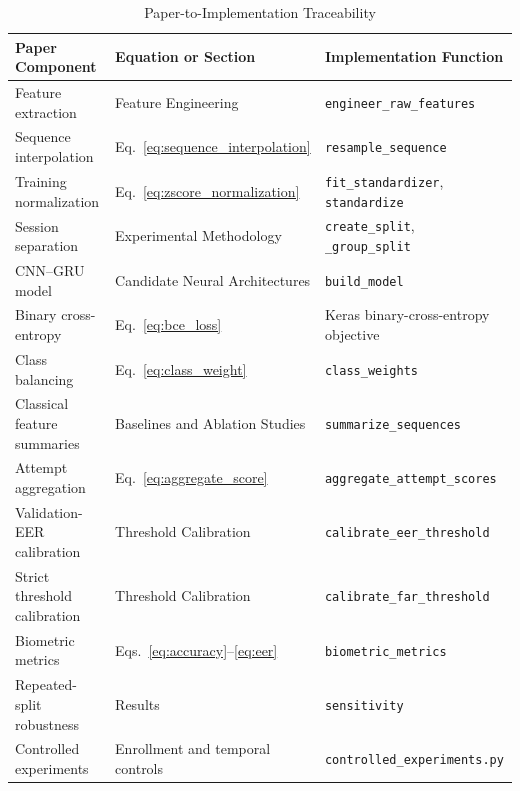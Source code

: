 \documentclass[conference]{IEEEtran}
\begin{document}
\begin{table}[t]
\centering
\caption{Paper-to-Implementation Traceability}
\label{tab:implementation_traceability}
\begin{tabular}{lll}
\toprule
\textbf{Paper Component} &
\textbf{Equation or Section} &
\textbf{Implementation Function} \\
\midrule

Feature extraction &
Feature Engineering &
\texttt{engineer\_raw\_features} \\

Sequence interpolation &
Eq.~\ref{eq:sequence_interpolation} &
\texttt{resample\_sequence} \\

Training normalization &
Eq.~\ref{eq:zscore_normalization} &
\texttt{fit\_standardizer}, \texttt{standardize} \\

Session separation &
Experimental Methodology &
\texttt{create\_split}, \texttt{\_group\_split} \\

CNN--GRU model &
Candidate Neural Architectures &
\texttt{build\_model} \\

Binary cross-entropy &
Eq.~\ref{eq:bce_loss} &
Keras binary-cross-entropy objective \\

Class balancing &
Eq.~\ref{eq:class_weight} &
\texttt{class\_weights} \\

Classical feature summaries &
Baselines and Ablation Studies &
\texttt{summarize\_sequences} \\

Attempt aggregation &
Eq.~\ref{eq:aggregate_score} &
\texttt{aggregate\_attempt\_scores} \\

Validation-EER calibration &
Threshold Calibration &
\texttt{calibrate\_eer\_threshold} \\

Strict threshold calibration &
Threshold Calibration &
\texttt{calibrate\_far\_threshold} \\

Biometric metrics &
Eqs.~\ref{eq:accuracy}--\ref{eq:eer} &
\texttt{biometric\_metrics} \\

Repeated-split robustness &
Results &
\texttt{sensitivity} \\

Controlled experiments &
Enrollment and temporal controls &
\texttt{controlled\_experiments.py} \\

\bottomrule
\end{tabular}
\end{table}
\end{document}
